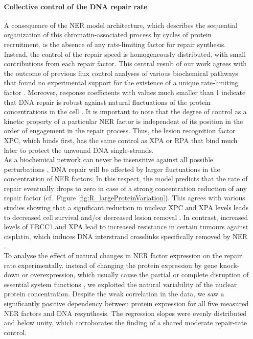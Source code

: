 \paragraph{Collective control of the DNA repair rate}
A consequence of the NER model architecture, which describes the sequential organization of this chromatin-associated process by cycles of protein recruitment, is the absence of any rate-limiting factor for repair synthesis. Instead, the control of the repair speed is homogeneously distributed, with small contributions from each repair factor. This central result of our work agrees with the outcome of previous flux control analyses of various biochemical pathways that found no experimental support for the existence of a unique rate-limiting factor \cite{Fell1992}. Moreover, response coefficients with values much smaller than 1 indicate that DNA repair is robust  against natural fluctuations of the protein concentrations in the cell \cite{Bluthgen2013}. It is important to note that the degree of control as a kinetic property of a particular NER factor is independent of its position in the order of engagement in the repair process. Thus, the lesion recognition factor XPC, which binds first, has the same control as XPA or RPA that bind much later to protect the unwound DNA single-strands.\\
As a biochemical network can never be insensitive against all possible perturbations \cite{Bluthgen2013,Csete2002}, DNA repair will be affected by larger fluctuations in the concentration of NER factors. In this respect, the model predicts that the rate of repair eventually drops to zero in case of a strong concentration reduction of any repair factor (cf.\ Figure \ref{fig:R_largeProteinVariation}). This agrees with various studies showing that a significant reduction in nuclear XPC and XPA levels leads to decreased cell survival and/or decreased lesion removal \cite{Koberle1999,Koberle2006,Renaud2011}. In contrast, increased levels of ERCC1 and XPA lead to increased resistance in certain tumours against cisplatin, which induces DNA interstrand crosslinks specifically removed by NER \cite{Koberle1999,Koberle2006,Renaud2011,Stewart2007,Arora2010}.   
\\ 
To analyse the effect of natural changes in NER factor expression on the repair rate experimentally, instead of changing the protein expression by gene knock-down or overexpression, which usually cause the partial or complete disruption of essential system functions \cite{Moriya2006}, we exploited the natural variability of the nuclear protein concentration. Despite the weak correlation in the data, we saw a significantly positive dependency between protein expression for all five measured NER factors and DNA resynthesis. The regression slopes were evenly distributed and below unity, which corroborates the finding of a shared moderate repair-rate control.\\  
